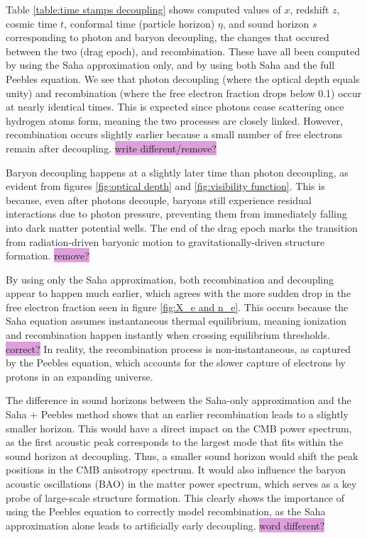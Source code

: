 \documentclass{aa}
\begin{document}
Table \ref{table:time stamps decoupling} shows computed values of $x$, redshift $z$, cosmic time $t$, conformal time (particle horizon) $\eta$, and sound horizon $s$ corresponding to photon and baryon decoupling, the changes that occured between the two (drag epoch), and recombination. These have all been computed by using the Saha approximation only, and by using both Saha and the full Peebles equation. We see that photon decoupling (where the optical depth equals unity) and recombination (where the free electron fraction drops below 0.1) occur at nearly identical times. This is expected since photons cease scattering once hydrogen atoms form, meaning the two processes are closely linked. However, recombination occurs slightly earlier because a small number of free electrons remain after decoupling. \colorbox{Plum}{write different/remove?} 

Baryon decoupling happens at a slightly later time than photon decoupling, as evident from figures \ref{fig:optical depth} and \ref{fig:visibility function}. This is because, even after photons decouple, baryons still experience residual interactions due to photon pressure, preventing them from immediately falling into dark matter potential wells. The end of the drag epoch marks the transition from radiation-driven baryonic motion to gravitationally-driven structure formation. \colorbox{Plum}{remove?}

By using only the Saha approximation, both recombination and decoupling appear to happen much earlier, which agrees with the more sudden drop in the free electron fraction seen in figure \ref{fig:X_e and n_e}. This occurs because the Saha equation assumes instantaneous thermal equilibrium, meaning ionization and recombination happen instantly when crossing equilibrium thresholds. \colorbox{Plum}{correct?} In reality, the recombination process is non-instantaneous, as captured by the Peebles equation, which accounts for the slower capture of electrons by protons in an expanding universe.

The difference in sound horizons between the Saha-only approximation and the Saha + Peebles method shows that an earlier recombination leads to a slightly smaller horizon. This would have a direct impact on the CMB power spectrum, as the first acoustic peak corresponds to the largest mode that fits within the sound horizon at decoupling. Thus, a smaller sound horizon would shift the peak positions in the CMB anisotropy spectrum. It would also influence the baryon acoustic oscillations (BAO) in the matter power spectrum, which serves as a key probe of large-scale structure formation. This clearly shows the importance of using the Peebles equation to correctly model recombination, as the Saha approximation alone leads to artificially early decoupling. \colorbox{Plum}{word different?}
\end{document}
